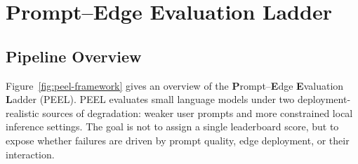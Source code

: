 \documentclass[letterpaper]{article} %
\begin{document}

\section{\textbf{P}rompt--\textbf{E}dge \textbf{E}valuation \textbf{L}adder}
\label{sec:peel}

\subsection{Pipeline Overview}
\label{sec:pipeline}

Figure~\ref{fig:peel-framework} gives an overview of the
\textbf{P}rompt--\textbf{E}dge \textbf{E}valuation \textbf{L}adder (PEEL).
PEEL evaluates small language models under two deployment-realistic sources of
degradation: weaker user prompts and more constrained local inference settings.
The goal is not to assign a single leaderboard score, but to expose whether
failures are driven by prompt quality, edge deployment, or their interaction.
\end{document}
